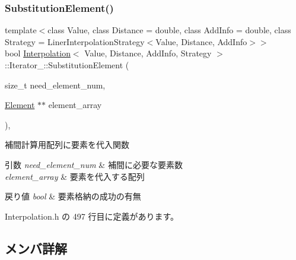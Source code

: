 \mbox{\label{class_interpolation_1_1_iterator___a8e886db816553a1d9f0c573e87f7a715}} 
\subsubsection{\texorpdfstring{Substitution\+Element()}{SubstitutionElement()}}
{\footnotesize\ttfamily template$<$class Value, class Distance = double, class Add\+Info = double, class Strategy = Liner\+Interpolation\+Strategy$<$\+Value, Distance, Add\+Info$>$$>$ \\
bool \mbox{\hyperlink{class_interpolation}{Interpolation}}$<$ Value, Distance, Add\+Info, Strategy $>$\+::Iterator\+\_\+\+::\+Substitution\+Element (\begin{DoxyParamCaption}\item[{size\+\_\+t}]{need\+\_\+element\+\_\+num,  }\item[{\mbox{\hyperlink{class_interpolation_a01e71544809483d7a2ee72fe0007bcb0}{Element}} $\ast$$\ast$}]{element\+\_\+array }\end{DoxyParamCaption})\hspace{0.3cm}{\ttfamily [inline]}, {\ttfamily [private]}}



補間計算用配列に要素を代入関数 


\begin{DoxyParams}{引数}
{\em need\+\_\+element\+\_\+num} & 補間に必要な要素数 \\
\hline
{\em element\+\_\+array} & 要素を代入する配列 \\
\hline
\end{DoxyParams}

\begin{DoxyRetVals}{戻り値}
{\em bool} & 要素格納の成功の有無 \\
\hline
\end{DoxyRetVals}


 Interpolation.\+h の 497 行目に定義があります。



\subsection{メンバ詳解}
\mbox{\label{class_interpolation_1_1_iterator___a3f81fac380c54424671b6bd123e3fd9f}} 
